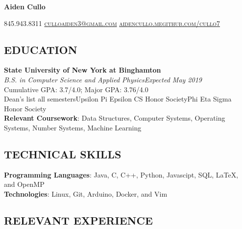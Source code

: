 \documentclass[10pt]{article}
\begin{document}
\centerline{\Huge \textbf{Aiden Cullo}}
\vspace{1.5mm}

\centerline{\textsc{845.943.8311 \sbar\href{mailto:culloaiden3@gmail.com}{culloaiden3@gmail.com} \sbar \href{http://aidencullo.me}{aidencullo.me}\sbar\href{https://github.com/cullo7}{github.com/cullo7}}}
\vspace{-1mm}
\subsection*{EDUCATION}

\spacedhrule{-0.1em}{0.5em}
\textbf{State University of New York at Binghamton} \\ 
\textit{B.S. in Computer Science and Applied Physics}\hfill \textit{Expected May 2019}\\
Cumulative GPA: 3.7/4.0;  Major GPA: 3.76/4.0\\
Dean's list all semesters\sbull Upsilon Pi Epsilon CS Honor Society\sbull Phi Eta Sigma Honor Society \\ 
\textbf{Relevant Coursework}: Data Structures, Computer Systems, Operating Systems, Number Systems, Machine Learning

\subsecspace
\subsection*{TECHNICAL SKILLS}
\spacedhrule{-0.1em}{0.5em}
\textbf{Programming Languages}: Java, C, C++, Python, Javascipt, SQL, \LaTeX, and OpenMP\\
\textbf{Technologies}: Linux, Git, Arduino, Docker, and Vim
\subsecspace
\subsection*{RELEVANT EXPERIENCE}
\spacedhrule{-0.1em}{0.5em}
\end{document}
